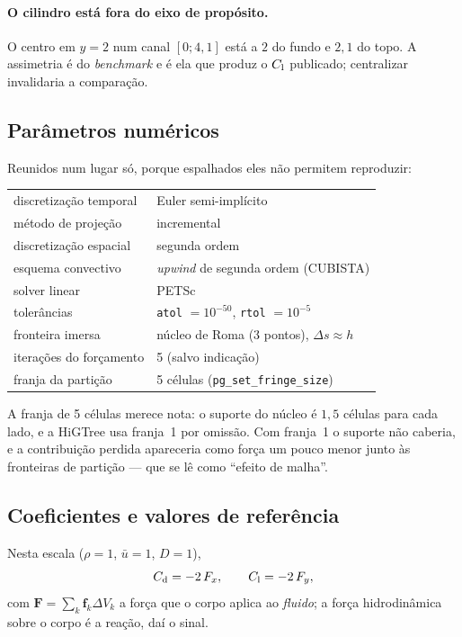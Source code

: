 \paragraph{O cilindro está fora do eixo de propósito.} O centro em $y=2$ num
canal $[0;4{,}1]$ está a $2$ do fundo e $2{,}1$ do topo. A assimetria é do
\emph{benchmark} e é ela que produz o $C_{\mathrm{l}}$ publicado; centralizar invalidaria a
comparação.

\subsection{Parâmetros numéricos}

Reunidos num lugar só, porque espalhados eles não permitem reproduzir:

\begin{center}
\begin{tabular}{ll}
  \toprule
  discretização temporal    & Euler semi-implícito \\
  método de projeção        & incremental \\
  discretização espacial    & segunda ordem \\
  esquema convectivo        & \emph{upwind} de segunda ordem (CUBISTA) \\
  solver linear             & PETSc \\
  tolerâncias               & \texttt{atol} $=10^{-50}$, \texttt{rtol} $=10^{-5}$ \\
  fronteira imersa          & núcleo de Roma (3 pontos), $\Delta s \approx h$ \\
  iterações do forçamento   & 5 (salvo indicação) \\
  franja da partição        & 5 células (\texttt{pg\_set\_fringe\_size}) \\
  \bottomrule
\end{tabular}
\end{center}

A franja de 5 células merece nota: o suporte do núcleo é $1{,}5$ células para
cada lado, e a HiGTree usa franja~1 por omissão. Com franja~1 o suporte não
caberia, e a contribuição perdida apareceria como força um pouco menor junto às
fronteiras de partição --- que se lê como ``efeito de malha''.

\subsection{Coeficientes e valores de referência}

Nesta escala ($\rho=1$, $\bar{u}=1$, $D=1$),
\begin{equation}
  C_{\mathrm{d}} = -2\,F_x, \qquad C_{\mathrm{l}} = -2\,F_y,
\end{equation}
com $\mathbf{F} = \sum_k \mathbf{f}_k \Delta V_k$ a força que o corpo aplica ao
\emph{fluido}; a força hidrodinâmica sobre o corpo é a reação, daí o sinal.

